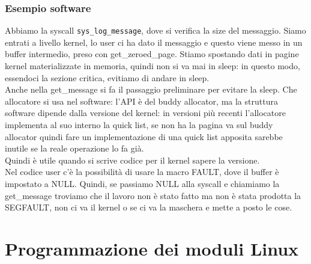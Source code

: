 \documentclass[12pt, oneside]{extbook}
\begin{document}
\subsection*{Esempio software}
Abbiamo la syscall \texttt{sys\_log\_message}, dove si verifica la size del messaggio. Siamo entrati a livello kernel, lo user ci ha dato il messaggio e questo viene messo in un buffer intermedio, preso con get\_zeroed\_page. Stiamo spostando dati in pagine kernel materializzate in memoria, quindi non si va mai in sleep: in questo modo, essendoci la sezione critica, evitiamo di andare in sleep.\\ Anche nella get\_message si fa il passaggio preliminare per evitare la sleep. Che allocatore si usa nel software: l'API è del buddy allocator, ma la struttura software dipende dalla versione del kernel: in versioni più recenti l'allocatore implementa al suo interno la quick list, se non ha la pagina va sul buddy allocator quindi fare un implementazione di una quick list apposita sarebbe inutile se la reale operazione lo fa già.\\Quindi è utile quando si scrive codice per il kernel sapere la versione.\\ Nel codice user c'è la possibilità di usare la macro FAULT, dove il buffer è impostato a NULL. Quindi, se passiamo NULL alla syscall e chiamiamo la get\_message troviamo che il lavoro non è stato fatto ma non è stata prodotta la SEGFAULT, non ci va il kernel o se ci va la maschera e mette a posto le cose.
\chapter{Programmazione dei moduli Linux}
\end{document}
